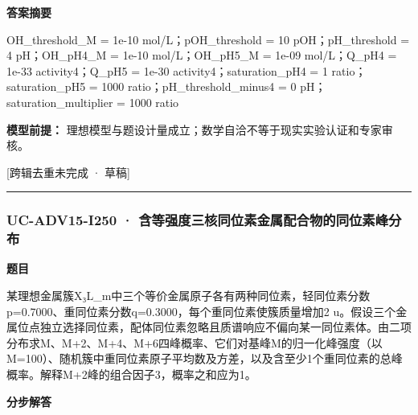 \documentclass[UTF8,11pt,a4paper]{ctexart}
\begin{document}
\noindent\textbf{答案摘要}\par
OH\_threshold\_M = 1e-10 mol/L；pOH\_threshold = 10 pOH；pH\_threshold = 4 pH；OH\_pH4\_M = 1e-10 mol/L；OH\_pH5\_M = 1e-09 mol/L；Q\_pH4 = 1e-33 activity4；Q\_pH5 = 1e-30 activity4；saturation\_pH4 = 1 ratio；saturation\_pH5 = 1000 ratio；pH\_threshold\_minus4 = 0 pH；saturation\_multiplier = 1000 ratio\par
\noindent\textbf{模型前提：}
理想模型与题设计量成立；数学自洽不等于现实实验认证和专家审核。\par
\noindent\textcolor{red!65!black}{[跨辑去重未完成 · 草稿]} \par
\medskip\hrule\medskip
{}
\subsubsection*{UC-ADV15-I250 · 含等强度三核同位素金属配合物的同位素峰分布}
\noindent\textbf{题目}\par
某理想金属簇X₃L\_m中三个等价金属原子各有两种同位素，轻同位素分数p=0.7000、重同位素分数q=0.3000，每个重同位素使簇质量增加2 u。假设三个金属位点独立选择同位素，配体同位素忽略且质谱响应不偏向某一同位素体。由二项分布求M、M+2、M+4、M+6四峰概率、它们对基峰M的归一化峰强度（以M=100）、随机簇中重同位素原子平均数及方差，以及含至少1个重同位素的总峰概率。解释M+2峰的组合因子3，概率之和应为1。\par
\medskip\noindent\textbf{分步解答}
\end{document}
